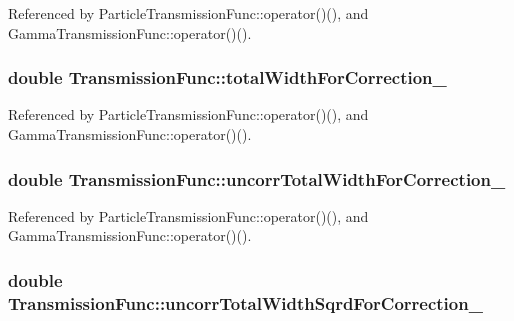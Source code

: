 Referenced by Particle\-Transmission\-Func\-::operator()(), and Gamma\-Transmission\-Func\-::operator()().

\hypertarget{classTransmissionFunc_ac8f1c0f81f9cf02997700fd285a56a6c}{
\subsubsection[{total\-Width\-For\-Correction\-\_\-}]{\setlength{\rightskip}{0pt plus 5cm}double Transmission\-Func\-::total\-Width\-For\-Correction\-\_\-\hspace{0.3cm}{\ttfamily [protected]}}}\label{classTransmissionFunc_ac8f1c0f81f9cf02997700fd285a56a6c}


Referenced by Particle\-Transmission\-Func\-::operator()(), and Gamma\-Transmission\-Func\-::operator()().

\hypertarget{classTransmissionFunc_a9933884d41c90c1f6e7190adf2eaf1b5}{
\subsubsection[{uncorr\-Total\-Width\-For\-Correction\-\_\-}]{\setlength{\rightskip}{0pt plus 5cm}double Transmission\-Func\-::uncorr\-Total\-Width\-For\-Correction\-\_\-\hspace{0.3cm}{\ttfamily [protected]}}}\label{classTransmissionFunc_a9933884d41c90c1f6e7190adf2eaf1b5}


Referenced by Particle\-Transmission\-Func\-::operator()(), and Gamma\-Transmission\-Func\-::operator()().

\hypertarget{classTransmissionFunc_a293237cc99320e8ccd8f9d87a2753110}{
\subsubsection[{uncorr\-Total\-Width\-Sqrd\-For\-Correction\-\_\-}]{\setlength{\rightskip}{0pt plus 5cm}double Transmission\-Func\-::uncorr\-Total\-Width\-Sqrd\-For\-Correction\-\_\-\hspace{0.3cm}{\ttfamily [protected]}}}\label{classTransmissionFunc_a293237cc99320e8ccd8f9d87a2753110}


